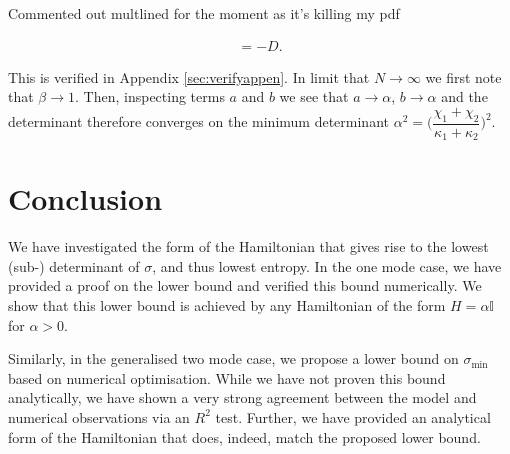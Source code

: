 \documentclass[11pt,a4paper]{article}
\numberwithin{equation}{section}
\begin{document}
	
	Commented out multlined for the moment as it's killing my pdf 
	\iffalse
	\[
	\begin{multlined}
	= \left(\begin{matrix}
	-\kappa_1 a - 2Nc & 0 \\
	0 & -\kappa_1 a - 2Nc \\ 
	0 & -\frac{1}{2}(\kappa_1 + \kappa_2)c - N(b-a)	\\ 
	\frac{1}{2}(\kappa_1 + \kappa_2)c - N(b-a) & 0 \\ 
	\end{matrix}\right. \quad\dotsm  \\
	\dotsm\quad\left.\begin{matrix}
	0 & \frac{1}{2}(\kappa_1 + \kappa_2)c - N(b-a)     \\
	-\frac{1}{2}(\kappa_1 + \kappa_2)c - N(b-a) & 0     \\
	-\kappa_2 b + 2Nc & 0     \\
	0 & -\kappa_2 b + 2Nc		\\
	\end{matrix}\right)
	\end{multlined}
	\]   
	\fi
	
	\begin{align*}
	&= -D.&	
	\end{align*}
	
	This is verified in Appendix \ref{sec:verifyappen}. In limit that $N \rightarrow \infty$ we first note that $\beta \rightarrow 1$. Then, inspecting terms $a$ and $b$ we see that $a \rightarrow \alpha$, $b \rightarrow \alpha$ and the determinant therefore converges on the minimum determinant $\alpha^2=\Big(\dfrac{\chi_1 + \chi_2}{\kappa_1 + \kappa_2}\Big)^2$.
	
	
	\section{Conclusion}
	\label{sec:conc}
	
	We have investigated the form of the Hamiltonian that gives rise to the lowest (sub-) determinant of $\sigma$, and thus lowest entropy. In the one mode case, we have provided a proof on the lower bound and verified this bound numerically. We show that this lower bound is achieved by any Hamiltonian of the form $H=\alpha\mathbb{I}$ for $\alpha>0$. 
	
	Similarly, in the generalised two mode case, we propose a lower bound on $\sigma_\text{min}$ based on numerical optimisation. While we have not proven this bound analytically, we have shown a very strong agreement between the model and numerical observations via an $R^2$ test. Further, we have provided an analytical form of the Hamiltonian that does, indeed, match the proposed lower bound. 
	
\end{document}
